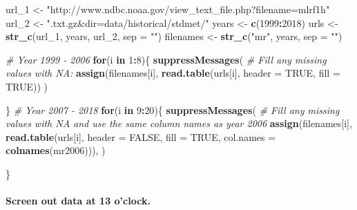 \documentclass[]{article}
\newenvironment{Shaded}{\begin{snugshade}}{\end{snugshade}}
\newcommand{\CommentTok}[1]{\textcolor[rgb]{0.56,0.35,0.01}{\textit{#1}}}
\newcommand{\ControlFlowTok}[1]{\textcolor[rgb]{0.13,0.29,0.53}{\textbf{#1}}}
\newcommand{\DataTypeTok}[1]{\textcolor[rgb]{0.13,0.29,0.53}{#1}}
\newcommand{\DecValTok}[1]{\textcolor[rgb]{0.00,0.00,0.81}{#1}}
\newcommand{\KeywordTok}[1]{\textcolor[rgb]{0.13,0.29,0.53}{\textbf{#1}}}
\newcommand{\NormalTok}[1]{#1}
\newcommand{\OperatorTok}[1]{\textcolor[rgb]{0.81,0.36,0.00}{\textbf{#1}}}
\newcommand{\OtherTok}[1]{\textcolor[rgb]{0.56,0.35,0.01}{#1}}
\newcommand{\StringTok}[1]{\textcolor[rgb]{0.31,0.60,0.02}{#1}}
\let\oldparagraph\paragraph
\renewcommand{\paragraph}[1]{\oldparagraph{#1}\mbox{}}
\begin{document}
\begin{Shaded}
\begin{Highlighting}[]
\NormalTok{url_}\DecValTok{1}\NormalTok{ <-}\StringTok{ "http://www.ndbc.noaa.gov/view_text_file.php?filename=mlrf1h"}
\NormalTok{url_}\DecValTok{2}\NormalTok{ <-}\StringTok{ ".txt.gz&dir=data/historical/stdmet/"}
\NormalTok{years <-}\StringTok{ }\KeywordTok{c}\NormalTok{(}\DecValTok{1999}\OperatorTok{:}\DecValTok{2018}\NormalTok{)}
\NormalTok{urls <-}\StringTok{ }\KeywordTok{str_c}\NormalTok{(url_}\DecValTok{1}\NormalTok{, years, url_}\DecValTok{2}\NormalTok{, }\DataTypeTok{sep =} \StringTok{""}\NormalTok{)}
\NormalTok{filenames <-}\StringTok{ }\KeywordTok{str_c}\NormalTok{(}\StringTok{"mr"}\NormalTok{, years, }\DataTypeTok{sep =} \StringTok{""}\NormalTok{)}


\CommentTok{# Year 1999 - 2006}
\ControlFlowTok{for}\NormalTok{(i }\ControlFlowTok{in} \DecValTok{1}\OperatorTok{:}\DecValTok{8}\NormalTok{)\{}
  \KeywordTok{suppressMessages}\NormalTok{(}
    \CommentTok{# Fill any missing values with NA:}
    \KeywordTok{assign}\NormalTok{(filenames[i], }\KeywordTok{read.table}\NormalTok{(urls[i], }\DataTypeTok{header =} \OtherTok{TRUE}\NormalTok{, }\DataTypeTok{fill =} \OtherTok{TRUE}\NormalTok{))}
\NormalTok{  )}
  
\NormalTok{\}}
\CommentTok{# Year 2007 - 2018}
\ControlFlowTok{for}\NormalTok{(i }\ControlFlowTok{in} \DecValTok{9}\OperatorTok{:}\DecValTok{20}\NormalTok{)\{}
  \KeywordTok{suppressMessages}\NormalTok{(}
    \CommentTok{# Fill any missing values with NA and use the same column names as year 2006}
    \KeywordTok{assign}\NormalTok{(filenames[i], }\KeywordTok{read.table}\NormalTok{(urls[i], }\DataTypeTok{header =} \OtherTok{FALSE}\NormalTok{, }
                                    \DataTypeTok{fill =} \OtherTok{TRUE}\NormalTok{, }\DataTypeTok{col.names =} \KeywordTok{colnames}\NormalTok{(mr2006))),}
\NormalTok{  )}
  
\NormalTok{\}}
\end{Highlighting}
\end{Shaded}

\hypertarget{screen-out-data-at-13-oclock.}{%
\paragraph{Screen out data at 13
o'clock.}\label{screen-out-data-at-13-oclock.}}
\end{document}
